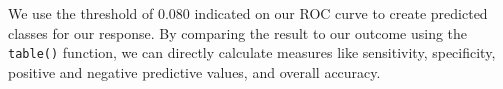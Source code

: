 \documentclass[
  letterpaper,
]{latex/krantz}
\makeatletter
\newenvironment{Shaded}{\begin{snugshade}}{\end{snugshade}}
\newcommand{\AttributeTok}[1]{\textcolor[rgb]{0.40,0.45,0.13}{#1}}
\newcommand{\CommentTok}[1]{\textcolor[rgb]{0.37,0.37,0.37}{#1}}
\newcommand{\DecValTok}[1]{\textcolor[rgb]{0.68,0.00,0.00}{#1}}
\newcommand{\FloatTok}[1]{\textcolor[rgb]{0.68,0.00,0.00}{#1}}
\newcommand{\FunctionTok}[1]{\textcolor[rgb]{0.28,0.35,0.67}{#1}}
\newcommand{\NormalTok}[1]{\textcolor[rgb]{0.00,0.23,0.31}{#1}}
\newcommand{\OtherTok}[1]{\textcolor[rgb]{0.00,0.23,0.31}{#1}}
\newcommand{\SpecialCharTok}[1]{\textcolor[rgb]{0.37,0.37,0.37}{#1}}
\newenvironment{kframe}{%
\medskip{}
\setlength{\fboxsep}{.8em}
 \def\at@end@of@kframe{}%
 \ifinner\ifhmode%
  \def\at@end@of@kframe{\end{minipage}}%
  \begin{minipage}{\columnwidth}%
 \fi\fi%
 \def\FrameCommand##1{\hskip\@totalleftmargin \hskip-\fboxsep
 \colorbox{shadecolor}{##1}\hskip-\fboxsep
     \hskip-\linewidth \hskip-\@totalleftmargin \hskip\columnwidth}%
 \MakeFramed {\advance\hsize-\width
   \@totalleftmargin\z@ \linewidth\hsize
   \@setminipage}}%
 {\par\unskip\endMakeFramed%
 \at@end@of@kframe}
\renewenvironment{Shaded}{\begin{kframe}}{\end{kframe}}
\makeatother
\begin{document}
\begin{Shaded}
\end{Shaded}

\newpage

We use the threshold of 0.080 indicated on our ROC curve to create
predicted classes for our response. By comparing the result to our
outcome using the \texttt{table()} function, we can directly calculate
measures like sensitivity, specificity, positive and negative predictive
values, and overall accuracy.

\begin{Shaded}
\end{Shaded}
\end{document}
